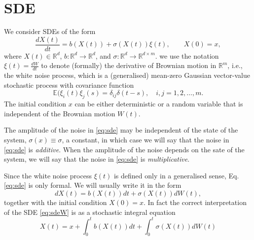 \documentclass{article}
\begin{document}
\section{SDE}
We consider SDEs of the form
\begin{equation}
    \frac{dX(t)}{dt} = b(X(t))+\sigma(X(t))\xi(t), \qquad X(0)=x, \label{eq:sde}
\end{equation}
where $X(t) \in \mathbb{R}^d$, $b:\mathbb{R}^d \to \mathbb{R}^d$, and $\sigma:\mathbb{R}^d \to \mathbb{R}^{d\times m}$. we use the notation $\xi (t) = \frac{dW}{dt}$ to denote (formally) the derivative of Brownian motion in $\mathbb{R}^m$, i.e., the white noise process, which is a (generalised) mean-zero Gaussian vector-value stochastic process with covariance function
$$\mathbb{E}(\xi_i(t)\xi_j(s) = \delta_{ij} \delta(t-s), \quad i,j=1,2,\dots,m.$$
The initial condition $x$ can be either deterministic or a random variable that is independent of the Brownian motion $W(t)$.

The amplitude of the noise in \eqref{eq:sde} may be independent of the state of the system, $\sigma(x) \equiv  \sigma$, a constant, in which case we will say that the noise in \eqref{eq:sde} is \textit{additive}. When the amplitude of the noise depends on the sate of the system, we will say that the noise in \eqref{eq:sde} is \textit{multiplicative}.

Since the white noise process $\xi(t)$ is defined only in a generalised sense,  Eq.\eqref{eq:sde} is only formal. We will usually write it in the form
\begin{equation}
    dX(t)= b(X(t))dt+\sigma(X(t))dW(t),
    \label{eq:sdeW}
\end{equation}
together with the initial condition $X(0)=x$. In fact the correct interpretation of the SDE \eqref{eq:sdeW} is as a stochastic integral equation
\begin{equation}
    X(t)=x+\int_0^t b(X(t))dt+\int_0^t \sigma(X(t)) dW(t)\label{eq:int}
\end{equation}
\end{document}
